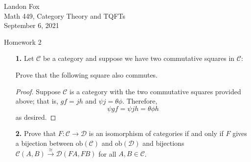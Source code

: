 \documentclass[ 12pt ]{article}
\begin{document}
\noindent Landon Fox \\
\noindent Math 449, Category Theory and TQFTs \\
\noindent September 6, 2021

\begin{center}
\Large Homework 2
\end{center}

\begin{enumerate}
	\item[\textbf{1.}] Let $\mathscr{C}$ be a category and suppose we have two commutative squares in $\mathscr{C}$:
		\begin{center}
		\end{center}
		Prove that the following square also commutes.
		\begin{center}
		\end{center}

		\begin{proof}
			Suppose $\mathscr{C}$ is a category with the two commutative squares provided above; that is, $gf = jh$ and $\psi j = \theta \phi$. Therefore, $$\psi g f = \psi j h = \theta \phi h$$ as desired.
		\end{proof}


	\item[\textbf{2.}] Prove that $F : \mathscr{C} \to \mathscr{D}$ is an isomorphism of categories if and only if $F$ gives a bijection between $\mathrm{ob}(\mathscr{C})$ and $\mathrm{ob}(\mathscr{D})$ and bijections $\mathscr{C}(A, B) \overset{\cong}{\to} \mathscr{D}(FA, FB)$ for all $A, B \in \mathscr{C}$.


\end{enumerate}
\end{document}
